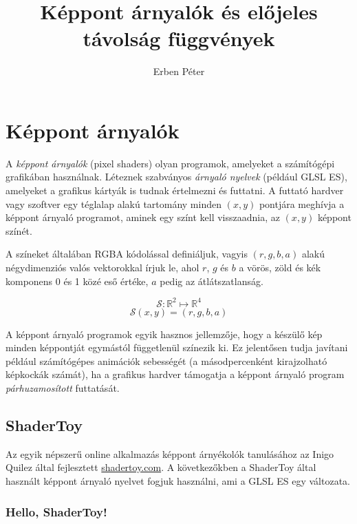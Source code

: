 

\title{Képpont árnyalók és előjeles távolság függvények}
\author{Erben Péter}


\maketitle

\section{Képpont árnyalók}

\begin{tcolorbox}[title=Képpont árnyalók]
A \emph{képpont árnyalók} (pixel shaders) olyan programok, amelyeket a számítógépi grafikában használnak.
Léteznek szabványos \emph{árnyaló nyelvek} (például GLSL ES), amelyeket a grafikus kártyák
is tudnak értelmezni és futtatni. A futtató hardver vagy szoftver egy téglalap alakú tartomány
minden $(x,y)$ pontjára meghívja a képpont árnyaló programot, aminek egy színt kell visszaadnia,
az $(x,y)$ képpont színét.

A színeket általában RGBA kódolással definiáljuk, vagyis $(r, g, b, a)$ alakú négydimenziós
valós vektorokkal írjuk le, ahol $r$, $g$ és $b$ a vörös, zöld és kék komponens 0 és 1 közé eső
értéke, $a$ pedig az átlátszatlanság.

$$\mathcal{S}: \mathbb{R}^2 \mapsto \mathbb{R}^4$$
$$\mathcal{S}(x, y) = (r, g, b, a)$$
\end{tcolorbox}

A képpont árnyaló programok egyik hasznos jellemzője, hogy a készülő kép minden képpontját
egymástól függetlenül színezik ki. Ez jelentősen tudja javítani például számítógépes animációk
sebességét (a másodpercenként kirajzolható képkockák számát), ha a grafikus hardver támogatja
a képpont árnyaló program \emph{párhuzamosított} futtatását.

\subsection{ShaderToy}

Az egyik népszerű online alkalmazás képpont árnyékolók tanulásához az Inigo Quilez által fejlesztett
\url{shadertoy.com}. A következőkben a ShaderToy által használt képpont árnyaló nyelvet fogjuk használni,
ami a GLSL ES egy változata.

\subsubsection{Hello, ShaderToy!}

